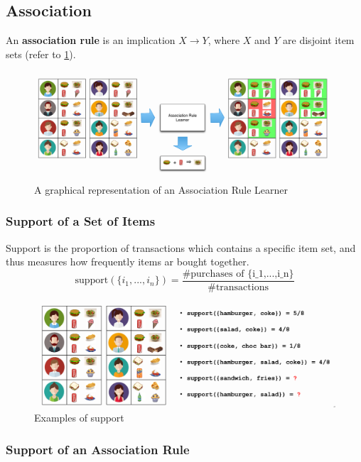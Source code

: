 \documentclass[a4paper, 11pt]{article}
\begin{document}
\subsection{Association}

An \textbf{association rule} is an implication $X\rightarrow Y$, where $X$ and $Y$ are disjoint item sets (refer to \ref{fig:associationrule}).

\begin{figure}[htb!]
	\centering
	\includegraphics[keepaspectratio, width=0.7\linewidth]{Pictures/association_rule}
	\caption{A graphical representation of an Association Rule Learner}
	\label{fig:associationrule}
\end{figure}

\subsubsection{Support of a Set of Items}

Support is the proportion of transactions which contains a specific item set, and thus measures how frequently items ar bought together.
\begin{equation*}
	\text{support}(\{i_1,...,i_n\}) = \frac{\#\text{purchases of \{i_1,...,i_n\}}}{\# \text{transactions}}
\end{equation*}

\begin{figure}[htb!]
	\centering
	\includegraphics[width=0.7\linewidth, keepaspectratio]{Pictures/support_example}
	\caption{Examples of support}
	\label{fig:supportexample}
\end{figure}

\subsubsection{Support of an Association Rule}
\end{document}
